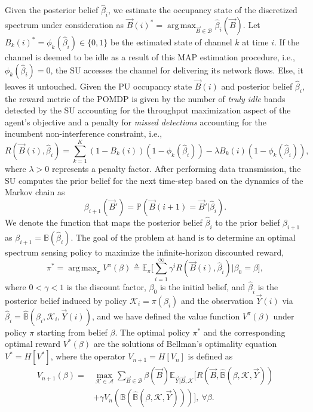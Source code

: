 \documentclass[10pt,twocolumn]{IEEEtran}
\DeclareMathOperator*{\argmax}{arg\,max}
\begin{document}
Given the posterior belief $\hat{\beta}_i$, we estimate the occupancy state of the discretized spectrum under consideration as $\vec{B}(i)^{*}{=}\argmax_{\vec{B} {\in} \mathcal{B}} \hat{\beta}_{i}(\vec{B})$. Let $B_{k}(i)^{*}{=}\phi_{k}(\hat{\beta}_{i}) {\in} \{0, 1\}$ be the estimated state of channel $k$ at time $i$. If the channel is deemed to be idle as a result of this MAP estimation procedure, i.e., $\phi_{k}(\hat{\beta}_{i}){=}0$, the SU accesses the channel for delivering its network flows. Else, it leaves it untouched. Given the PU occupancy state $\vec{B}(i)$ and posterior belief $\hat\beta_i$, the reward metric of the POMDP is given by the number of \emph{truly idle} bands detected by the SU accounting for the throughput maximization aspect of the agent's objective and a penalty for \emph{missed detections} accounting for the incumbent non-interference constraint, i.e.,
\begin{equation}
\nonumber
    R(\vec{B}(i), \hat{\beta}_i){=}\sum_{k=1}^{K} (1{-}B_k(i))(1{-}\phi_k(\hat{\beta}_{i})){-}\lambda B_k(i)(1 - \phi_k(\hat{\beta}_i)),
\end{equation}
where $\lambda{>}0$ represents a penalty factor. After performing data transmission, the SU computes the prior belief for the next time-step based on the dynamics of the Markov chain as
\begin{equation}\label{13}
    \beta_{i+1}(\vec{B}') = \mathbb{P}(\vec{B}(i+1) = \vec{B}'|\hat{\beta}_{i}).
\end{equation}
We denote the function that maps the posterior belief $\hat\beta_i$ to the prior belief $\beta_{i+1}$ as $\beta_{i+1}{=}{\mathbb B}(\hat\beta_i)$.
The goal of the problem at hand is to determine an optimal spectrum sensing policy to maximize the infinite-horizon discounted reward,
\begin{equation}\label{14}
    \pi^{*}{=}\argmax_{\pi} V^{\pi}(\beta) \triangleq \mathbb{E}_{\pi} \Big[\sum_{i=1}^{\infty} \gamma^{i} R(\vec{B}(i), \hat{\beta}_i)|\beta_0 {=}\beta\Big],
\end{equation}
where $0{<}\gamma{<}1$ is the discount factor, $\beta_0$ is the initial belief, and $\hat\beta_i$ is the posterior belief induced by policy $\mathcal K_i{=}\pi(\beta_i)$ and the observation $\vec{Y}(i)$ via $\hat\beta_i{=}\hat{\mathbb B}(\beta_i, \mathcal K_i, \vec{Y}(i))$, and we have defined the value function $V^{\pi}(\beta)$ under policy $\pi$ starting from belief $\beta$.
The optimal policy $\pi^*$ and the corresponding optimal reward $V^*(\beta)$ are the solutions of Bellman's optimality equation $V^*{=}H[V^*]$, where the operator $V_{n+1}{=}H[V_n]$ is defined as
\begin{align}\label{16}
\nonumber
        V_{n+1}(\beta) = &\max_{\mathcal{K} {\in} \mathcal{A}} \sum_{\vec{B} {\in} \mathcal{B}} \beta(\vec{B}) \mathbb{E}_{\vec{Y}|\vec{B}, \mathcal{K}} \Big[R(\vec{B}, \hat{\mathbb{B}}(\beta, \mathcal{K}, \vec{Y}))\\ &+\gamma V_n(\mathbb{B}(\hat{\mathbb{B}}(\beta, \mathcal{K}, \vec{Y})))\Big],\ \forall \beta.
\end{align}
\end{document}
